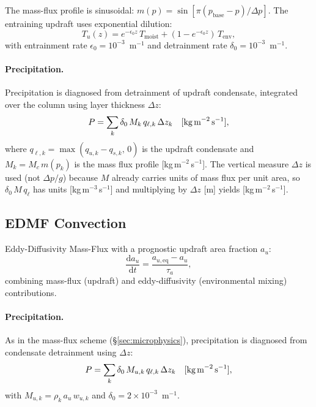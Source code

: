 \documentclass[11pt,twoside]{report}
\newcommand{\dd}{\mathrm{d}}
\begin{document}
The mass-flux profile is sinusoidal:
$m(p) = \sin[\pi(p_{\mathrm{base}}-p)/\Delta p]$.
The entraining updraft uses exponential dilution:
\begin{equation}
  T_u(z) = e^{-\epsilon_0 z}\,T_{\mathrm{moist}}
  + (1-e^{-\epsilon_0 z})\,T_{\mathrm{env}},
\end{equation}
with entrainment rate $\epsilon_0=10^{-3}$~m$^{-1}$ and detrainment
rate $\delta_0=10^{-3}$~m$^{-1}$.

\paragraph{Precipitation.}
Precipitation is diagnosed from detrainment of updraft condensate,
integrated over the column using layer thickness $\Delta z$:
\begin{equation}
  P = \sum_k \delta_0\,M_k\,q_{\ell,k}\,\Delta z_k
  \quad [\text{kg\,m}^{-2}\,\text{s}^{-1}],
\end{equation}
where $q_{\ell,k}=\max(q_{u,k}-q_{s,k},\,0)$ is the updraft condensate
and $M_k=M_c\,m(p_k)$ is the mass flux profile [kg\,m$^{-2}$\,s$^{-1}$].
The vertical measure $\Delta z$ is used (not $\Delta p/g$) because $M$
already carries units of mass flux per unit area, so $\delta_0\,M\,q_\ell$
has units [kg\,m$^{-3}$\,s$^{-1}$] and multiplying by $\Delta z$ [m]
yields [kg\,m$^{-2}$\,s$^{-1}$].

\subsection{EDMF Convection}

Eddy-Diffusivity Mass-Flux with a prognostic updraft area fraction $a_u$:
\begin{equation}
  \frac{\dd a_u}{\dd t} = \frac{a_{u,\mathrm{eq}}-a_u}{\tau_a},
\end{equation}
combining mass-flux (updraft) and eddy-diffusivity (environmental mixing)
contributions.

\paragraph{Precipitation.}
As in the mass-flux scheme (\S\ref{sec:microphysics}), precipitation
is diagnosed from condensate detrainment using $\Delta z$:
\begin{equation}
  P = \sum_k \delta_0\,M_{u,k}\,q_{\ell,k}\,\Delta z_k
  \quad [\text{kg\,m}^{-2}\,\text{s}^{-1}],
\end{equation}
with $M_{u,k}=\rho_k\,a_u\,w_{u,k}$ and $\delta_0=2\times10^{-3}$~m$^{-1}$.
\end{document}
